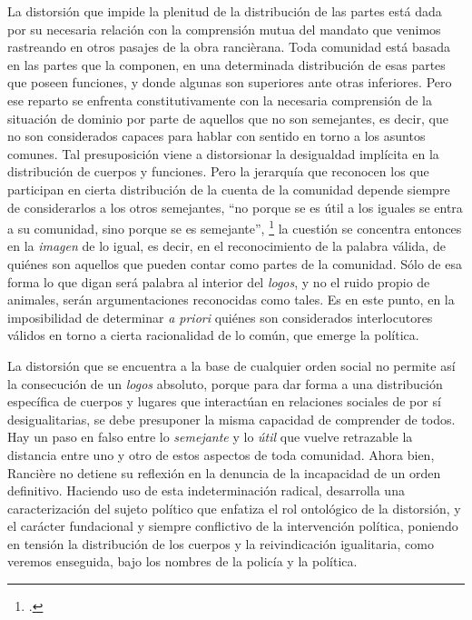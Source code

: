 La distorsión que impide la plenitud de la distribución de las partes está dada por su necesaria relación con la comprensión mutua del mandato que venimos rastreando en otros pasajes de la obra rancièrana. Toda comunidad está basada en las partes que la componen, en una determinada distribución de esas partes que poseen funciones, y donde algunas son superiores ante otras inferiores. Pero ese reparto se enfrenta constitutivamente con la necesaria comprensión de la situación de dominio por parte de aquellos que no son semejantes, es decir, que no son considerados capaces para hablar con sentido en torno a los asuntos comunes. Tal presuposición viene a distorsionar la desigualdad implícita en la distribución de cuerpos y funciones. Pero la jerarquía que reconocen los que participan en cierta distribución de la cuenta de la comunidad depende siempre de considerarlos a los otros semejantes, \enquote{no porque se es útil a los iguales se entra a su comunidad, sino porque se es semejante}, \footcite[][54]{@7065-RANCIERE2007} la cuestión se concentra entonces en la \emph{imagen} de lo igual, es decir, en el reconocimiento de la palabra válida, de quiénes son aquellos que pueden contar como partes de la comunidad. Sólo de esa forma lo que digan será palabra al interior del \emph{logos}, y no el ruido propio de animales, serán argumentaciones reconocidas como tales. Es en este punto, en la imposibilidad de determinar \emph{a priori} quiénes son considerados interlocutores válidos en torno a cierta racionalidad de lo común, que emerge la política.

La distorsión que se encuentra a la base de cualquier orden social no permite así la consecución de un \emph{logos} absoluto, porque para dar forma a una distribución específica de cuerpos y lugares que interactúan en relaciones sociales de por sí desigualitarias, se debe presuponer la misma capacidad de comprender de todos. Hay un paso en falso entre lo \emph{semejante} y lo \emph{útil} que vuelve retrazable la distancia entre uno y otro de estos aspectos de toda comunidad. Ahora bien, Rancière no detiene su reflexión en la denuncia de la incapacidad de un orden definitivo. Haciendo uso de esta indeterminación radical, desarrolla una caracterización del sujeto político que enfatiza el rol ontológico de la distorsión, y el carácter fundacional y siempre conflictivo de la intervención política, poniendo en tensión la distribución de los cuerpos y la reivindicación igualitaria, como veremos enseguida, bajo los nombres de la policía y la política.

